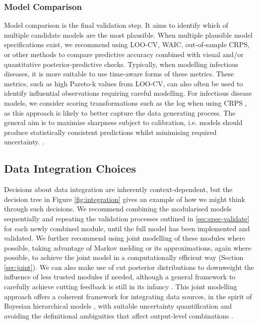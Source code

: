 \documentclass{article}
\begin{document}
\subsubsection{Model Comparison}

Model comparison is the final validation step. It aims to identify which of multiple candidate models are the most plausible.
When multiple plausible model specifications exist, we recommend using \ac{LOO-CV}, \ac{WAIC}, out-of-sample \ac{CRPS}, or other methods to compare predictive accuracy \citep{yao2018using,gneiting2007strictly} combined with visual and/or quantitative posterior-predictive checks.
Typically, when modelling infectious diseases, it is more suitable to use time-aware forms of these metrics.
These metrics, such as high Pareto-k values from \ac{LOO-CV}, can also often be used to identify influential observations requiring careful modelling.
For infectious disease models, we consider scoring transformations such as the log when using \ac{CRPS} \citep{bosse2023scoring}, as this approach is likely to better capture the data generating process.
The general aim is to maximise sharpness subject to calibration, i.e. models should produce statistically consistent predictions whilst minimising required uncertainty. \citep{gneiting2007strictly}.

\subsection{Data Integration Choices}\label{sec:integration}

Decisions about data integration are inherently context-dependent, but the decision tree in Figure \ref{fig:integration} gives an example of how we might think through such decisions. We recommend combining the modularised models sequentially and repeating the validation processes outlined in \ref{sec:spec-validate} for each newly combined module, until the full model has been implemented and validated.
We further recommend using joint modelling of these modules where possible, taking advantage of Markov melding \citep{goudie2019joining} or its approximations, again where possible, to achieve the joint model in a computationally efficient way (Section \ref{sec:joint}). We can also make use of cut posterior distributions \citep{plummer2015cuts} to downweight the influence of less trusted modules if needed, although a general framework to carefully achieve cutting feedback is still in its infancy \citep{liu2025general}. 
This joint modelling approach offers a coherent framework for integrating data sources, in the spirit of Bayesian hierarchical models \citep{gelman2020bayesian,deangelis2018analysing}, with suitable uncertainty quantification and avoiding the definitional ambiguities that affect output-level combinations \citep{manley2024combining, brockhaus2023why}. 
\end{document}
